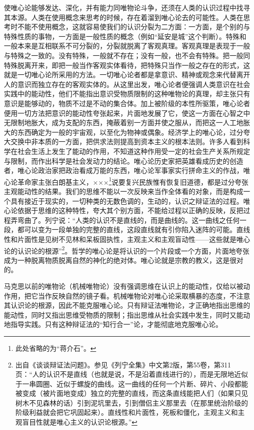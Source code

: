 \documentclass[UTF8, 12pt, a4paper]{ctexrep}
\begin{document}
使唯心论能够发达、深化，并有能力同唯物论斗争，还须在人类的认识过程中找寻其本源。人类在使用概念来思考的时候，存在着溜到唯心论去的可能性。人类在思考时不能不使用概念，这就容易使我们的认识分裂为二方面：一方面，是个别的与特殊性质的事物，一方面是一般性质的概念（例如“延安是城”这个判断）。特殊和一般本来是互相联系不可分裂的，分裂就脱离了客观真理。客观真理是表现于一般与特殊之一致的。没有特殊，一般就不存在；没有一般，也不会有特殊。把一般同特殊脱离开来，即把一般当作客观实体看待，把特殊只当作一般之存在的形式，这就是一切唯心论所采用的方法。一切唯心论者都是拿意识、精神或观念来代替离开人的意识而独立存在的客观实体的。从这里出发，唯心论者便强调人类意识在社会实践中的能动性，他们不能指出意识受物质限制的这种唯物论的真理，却主张只有意识是能够动的，物质不过是不动的集合体。加上被阶级的本性所驱策，唯心论者便用一切方法把意识的能动性夸张起来，片面地发展了它，使这一方面在心智之中无限制地胀大，成为支配的东西，掩蔽着别一方面并使之服从，而把这一人工地胀大的东西确定为一般的宇宙观，以至化为物神或偶象。经济学上的唯心论，过分夸大交换中非本质的一方面，把供求法则提高到资本主义的根本法则。许多人看到科学在社会生活上发生了能动的作用，不知道这种作用受一定的社会生产关系所规定与限制，而作出科学是社会发动力的结论。唯心论历史家把英雄看成历史的创造者，唯心论政治家把政治看成万能的东西，唯心论军事家实行拼命主义的作战，唯心论革命家主张白朗基主义，×××\footnote{此处省略的为“蒋介石”。}说要复兴民族惟有恢复旧道德，都是过分夸张主观能动性的结果。我们的思维不能以一次反映来当作全体看的对象，而是构成一个具有接近于现实的，一切种类的无数色调的，生动的，认识之辩证法的过程。唯心论依据于思维的这种特性，夸大其个别方面，不能给过程以正确的反映，反把过程弄弯曲了。列宁说：“人类的认识不是直线的，而是曲线的。这一曲线之任何一段，都可以变为一段单独的完整的直线，这段直线就有引你陷入迷阵的可能。直线性和片面性是见树不见林和呆板固执性，主观主义和主观盲动性——这些就是唯心论的认识论的根源”\footnote{出自《谈谈辩证法问题》。参见《列宁全集》中文第2版，第55卷，第311页：“人的认识不是直线（也就是说，不是沿着直线进行的），而是无限地近似于一串圆圈、近似于螺旋的曲线。这一曲线的任何一个片断、碎片、小段都能被变成（被片面地变成）独立的完整的直线，而这条直线能把人们（如果只见树木不见森林的话）引到泥坑里去，引到僧侣主义那里去（在那里统治阶级的阶级利益就会把它巩固起来）。直线性和片面性，死板和僵化，主观主义和主观盲目性就是唯心主义的认识论根源。”}。哲学的唯心论是将认识的一个片段或一个方面，片面地夸张成为一种脱离物质脱离自然的神化的绝对体。唯心论就是宗教的教义，这是很对的。

马克思以前的唯物论（机械唯物论）没有强调思维在认识上的能动性，仅给以被动作用，把它当作反映自然的镜子看。机械唯物论对唯心论采取横暴的态度，不注意其认识论的根源，因此不能克服唯心论。只有辩证法唯物论，才正确地指出思维的能动性，同时又指出思维受物质的限制；指出思维从社会实践中发生，同时又能动地指导实践。只有这种辩证法的“知行合一”论，才能彻底地克服唯心论。
\end{document}
